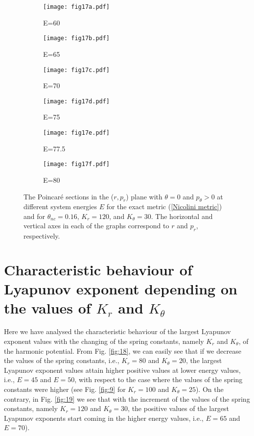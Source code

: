 \documentclass[aps,prd,showpacs,nofootinbib,floats,floatfix,preprintnumbers,groupedaddress,twocolumn]{revtex4-1}
\begin{document}
\begin{figure}[hbt]
	\centering
	\begin{subfigure}[b]{0.49\linewidth}
		\texttt{[image: fig17a.pdf]}
		\caption{E=60}
	\end{subfigure}
	\begin{subfigure}[b]{0.49\linewidth}
		\texttt{[image: fig17b.pdf]}
		\caption{E=65}
	\end{subfigure}
	\begin{subfigure}[b]{0.49\linewidth}
		\texttt{[image: fig17c.pdf]}
		\caption{E=70}
	\end{subfigure}
	\begin{subfigure}[b]{0.49\linewidth}
		\texttt{[image: fig17d.pdf]}
		\caption{E=75}
	\end{subfigure}
	\begin{subfigure}[b]{0.49\linewidth}
	\texttt{[image: fig17e.pdf]}
	\caption{E=77.5}
	\end{subfigure}
	\begin{subfigure}[b]{0.49\linewidth}
	\texttt{[image: fig17f.pdf]}
	\caption{E=80}
	\end{subfigure}
	\caption{The Poincar\'e sections in the ($r,p_r$) plane with $\theta = 0$ and $p_\theta > 0$ at different system energies $E$ for the exact metric (\ref{Nicolini metric})  and for $\theta_{nc}=0.16$, $K_{r}=120$, and  $K_{\theta}=30$. The horizontal and vertical axes in each of the graphs correspond to $r$ and $p_r$, respectively.}
	\label{fig:17}
\end{figure}
%
%
%
%
\section{{\label{App4}}Characteristic behaviour of Lyapunov exponent depending on the values of $K_r$ and $K_{\theta}$}
%
%
%
%
\par\noindent
Here we have analysed the characteristic behaviour of the largest Lyapunov exponent values with the changing of the spring constants, namely $K_{r}$ and $K_{\theta}$, of the harmonic potential. From Fig. \ref{fig:18}, we can easily see that if we decrease the values of the spring constants, i.e., $K_{r}=80$ and $K_{\theta}=20$, the largest Lyapunov exponent values attain higher positive values at lower energy values, i.e., $E=45$ and $E=50$, with respect to the case where the values of the spring constants were higher (see Fig. \ref{fig:9} for $K_{r}=100$ and $K_{\theta}=25$). On the contrary, in Fig. \ref{fig:19} we see that with the increment of the values of the spring constants, namely $K_{r}=120$ and $K_{\theta}=30$, the positive values of the largest Lyapunov exponents start coming in the higher energy values, i.e., $E=65$ and $E=70$).  
\end{document}
